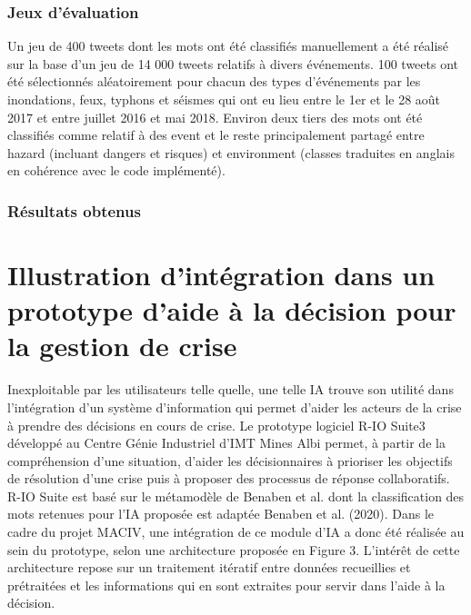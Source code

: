 \subsubsection*{Jeux d'évaluation}

Un jeu de 400 tweets dont les mots ont été classifiés manuellement a été réalisé sur la base d'un jeu de 14 000 tweets relatifs à divers événements.
100 tweets ont été sélectionnés aléatoirement pour chacun des types d'événements par les inondations, feux, typhons et séismes qui ont eu lieu entre le 1er et le 28 août 2017 et entre juillet 2016 et mai 2018.
Environ deux tiers des mots ont été classifiés comme relatif à des event et le reste principalement partagé entre hazard (incluant dangers et risques) et environment (classes traduites en anglais en cohérence avec le code implémenté).


\subsubsection*{Résultats obtenus}


\section*{Illustration d'intégration dans un prototype d'aide à la décision pour la gestion de crise}

Inexploitable par les utilisateurs telle quelle, une telle IA trouve son utilité dans
l'intégration d'un système d'information qui permet d'aider les acteurs de la crise à
prendre des décisions en cours de crise. Le prototype logiciel R-IO Suite3 développé
au Centre Génie Industriel d'IMT Mines Albi permet, à partir de la compréhension
d'une situation, d'aider les décisionnaires à prioriser les objectifs de résolution d'une
crise puis à proposer des processus de réponse collaboratifs. R-IO Suite est basé
sur le métamodèle de Benaben et al. dont la classification des mots retenues pour
l'IA proposée est adaptée Benaben et al. (2020).
Dans le cadre du projet MACIV, une intégration de ce module d'IA a donc été réalisée au sein du prototype, selon
une architecture proposée en Figure 3.
L'intérêt de cette architecture repose sur un traitement itératif entre données recueillies et prétraitées et les informations qui en sont extraites pour servir dans l'aide à la décision.

